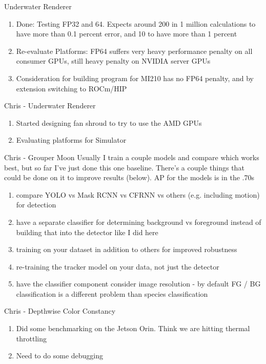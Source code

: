 \begin{frame}{Underwater Renderer}
    \begin{enumerate}
	    \item Done: Testing FP32 and 64. Expects around 200 in 1 million calculations to have more than 0.1 percent error, and 10 to have more than 1 percent
			\item Re-evaluate Platforms: FP64 suffers very heavy performance penalty on all consumer GPUs, still heavy penalty on NVIDIA server GPUs
			\item Consideration for building program for MI210 has no FP64 penalty, and by extension switching to ROCm/HIP
    \end{enumerate}
\end{frame}

\begin{frame}{Chris - Underwater Renderer}
	\begin{enumerate}
 		\item Started designing fan shroud to try to use the AMD GPUs
   \item Evaluating platforms for Simulator
 	\end{enumerate}
\end{frame}

\begin{frame}{Chris - Grouper Moon}
Usually I train a couple models and compare which works best, but so far I've just done this one baseline. There's a couple things that could be done on it to improve results (below). AP for the models is in the .70s

\begin{enumerate}
\item compare YOLO vs Mask RCNN vs CFRNN vs others (e.g. including motion) for detection
\item have a separate classifier for determining background vs foreground instead of building that into the detector like I did here
\item training on your dataset in addition to others for improved robustness
\item re-training the tracker model on your data, not just the detector
\item have the classifier component consider image resolution - by default FG / BG classification is a different problem than species classification
\end{enumerate}
\end{frame}


\begin{frame}{Chris - Depthwise Color Constancy}
\begin{enumerate}
\item Did some benchmarking on the Jetson Orin.  Think we are hitting thermal throttling
\item Need to do some debugging
\end{enumerate}
\end{frame}
